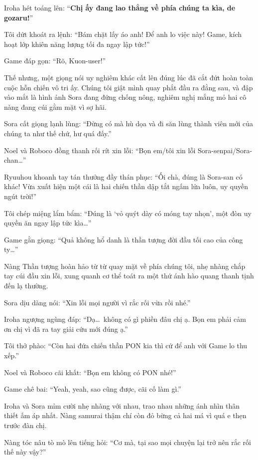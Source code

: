 \documentclass[../main.tex]{subfiles}
\begin{document}
Iroha hét toáng lên: ``\textbf{Chị ấy đang lao thẳng về phía chúng ta kìa, de gozaru!}''

Tôi dứt khoát ra lệnh: ``Bám chặt lấy áo anh! Để anh lo việc này! Game, kích hoạt lớp khiên năng lượng tối đa ngay lập tức!''

Game đáp gọn: ``Rõ, Kuon-user!''

Thế nhưng, một giọng nói uy nghiêm khác cất lên đúng lúc đã cắt đứt hoàn toàn cuộc hỗn chiến vô tri ấy. Chúng tôi giật mình quay phắt đầu ra đằng sau, và đập vào mắt là hình ảnh Sora đang đứng chống nông, nghiêm nghị mắng mỏ hai cô nàng đang cúi gằm mặt vì sợ hãi.

Sora cất giọng lạnh lùng: ``Đừng có mà hù dọa và đi săn lùng thành viên mới của chúng ta như thế chứ, hư quá đấy.''


Noel và Roboco đồng thanh rối rít xin lỗi: ``Bọn em/tôi xin lỗi Sora-senpai/Sora-chan\dots''

Ryuuhou khoanh tay tán thưởng đầy thán phục: ``Ối chà, đúng là Sora-san có khác! Vừa xuất hiện một cái là hai chiến thần dập tắt ngấm lửa luôn, uy quyền ngút trời!''

Tôi chép miệng lẩm bẩm: ``Đúng là `vỏ quýt dày có móng tay nhọn', một đòn uy quyền ăn ngay lập tức kìa\dots''

Game gằn giọng: ``Quả không hổ danh là thần tượng đời đầu tối cao của công ty\dots''

Nàng Thần tượng hoàn hảo từ từ quay mặt về phía chúng tôi, nhẹ nhàng chắp tay cúi đầu xin lỗi, xung quanh cơ thể toát ra một thứ ánh hào quang thanh tịnh đến lạ thường.

Sora dịu dàng nói: ``Xin lỗi mọi người vì rắc rối vừa rồi nhé.''

Iroha ngượng ngùng đáp: ``Dạ\dots\ không có gì phiền đâu chị ạ. Bọn em phải cảm ơn chị vì đã ra tay giải cứu mới đúng ạ.''

Tôi thở phào: ``Còn hai đứa chiến thần PON kia thì cứ để anh với Game lo thu xếp.''

Noel và Roboco cãi khất: ``Bọn em không có PON nhé!''

Game chê bai: ``Yeah, yeah, sao cũng được, cãi cố làm gì.''

Iroha và Sora mỉm cười nhẹ nhàng với nhau, trao nhau những ánh nhìn thân thiết ấm áp nhất. Nàng samurai thậm chí còn đỏ bừng cả hai má vì quá e thẹn trước đàn chị.

Nàng tóc nâu tò mò lên tiếng hỏi: ``Cơ mà, tại sao mọi chuyện lại trở nên rắc rối thế này vậy?''
\end{document}
